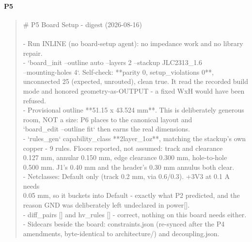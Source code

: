 \documentclass[11pt,a4paper]{article}
\begin{document}
\paragraph*{P5}
\begin{quote}\small\ttfamily\raggedright
\# P5 Board Setup - digest (2026-08-16)\\
~\\
- Run INLINE (no board-setup agent): no impedance work and no library repair.\\
- `board\_init --outline auto --layers 2 --stackup JLC2313\_1.6\\
  --mounting-holes 4`. Self-check: {*}{*}parity 0, setup\_violations 0{*}{*},\\
  unconnected 25 (expected, unrouted), clean true. It read the recorded build\\
  mode and honored geometry-as-OUTPUT - a fixed WxH would have been refused.\\
- Provisional outline {*}{*}51.15 x 43.524 mm{*}{*}. This is deliberately generous\\
  room, NOT a size: P6 places to the canonical layout and\\
  `board\_edit --outline fit` then earns the real dimensions.\\
- `rules\_gen` capability\_class {*}{*}2layer\_1oz{*}{*}, matching the stackup's own\\
  copper - 9 rules. Floors reported, not assumed: track and clearance\\
  0.127 mm, annular 0.150 mm, edge clearance 0.300 mm, hole-to-hole\\
  0.500 mm. J1's 0.40 mm and the header's 0.30 mm annulus both clear.\\
- Netclasses: Default only (track 0.2 mm, via 0.6/0.3). +3V3 at 0.1 A needs\\
  0.05 mm, so it buckets into Default - exactly what P2 predicted, and the\\
  reason GND was deliberately left undeclared in power{[}{]}.\\
- diff\_pairs {[}{]} and hv\_rules {[}{]} - correct, nothing on this board needs either.\\
- Sidecars beside the board: constraints.json (re-synced after the P4\\
  amendments, byte-identical to architecture/) and decoupling.json.
\end{quote}
\end{document}
